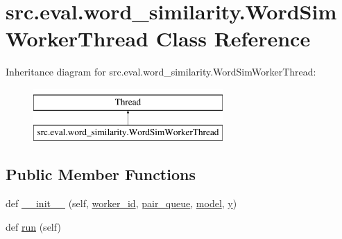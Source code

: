 \hypertarget{classsrc_1_1eval_1_1word__similarity_1_1_word_sim_worker_thread}{}\section{src.\+eval.\+word\+\_\+similarity.\+Word\+Sim\+Worker\+Thread Class Reference}
\label{classsrc_1_1eval_1_1word__similarity_1_1_word_sim_worker_thread}
Inheritance diagram for src.\+eval.\+word\+\_\+similarity.\+Word\+Sim\+Worker\+Thread\+:\begin{figure}[H]
\begin{center}
\leavevmode
\includegraphics[height=2.000000cm]{classsrc_1_1eval_1_1word__similarity_1_1_word_sim_worker_thread}
\end{center}
\end{figure}
\subsection*{Public Member Functions}
\begin{DoxyCompactItemize}
\item 
def \hyperlink{classsrc_1_1eval_1_1word__similarity_1_1_word_sim_worker_thread_a3b3812382c5f42639526fb04e9cd669b}{\+\_\+\+\_\+init\+\_\+\+\_\+} (self, \hyperlink{classsrc_1_1eval_1_1word__similarity_1_1_word_sim_worker_thread_a37e8696ce9b04d6558d24f6f03852284}{worker\+\_\+id}, \hyperlink{classsrc_1_1eval_1_1word__similarity_1_1_word_sim_worker_thread_a22f86f1d8e6ba9b21656ae514bdcde05}{pair\+\_\+queue}, \hyperlink{classsrc_1_1eval_1_1word__similarity_1_1_word_sim_worker_thread_a71ee40a2cd50bb58d04300a80c27e73e}{model}, \hyperlink{classsrc_1_1eval_1_1word__similarity_1_1_word_sim_worker_thread_a0bd37d37430bab580530afb9c5769797}{y})
\item 
def \hyperlink{classsrc_1_1eval_1_1word__similarity_1_1_word_sim_worker_thread_a4d2dbdac00deb01c84b93fe4a65f6461}{run} (self)
\end{DoxyCompactItemize}
